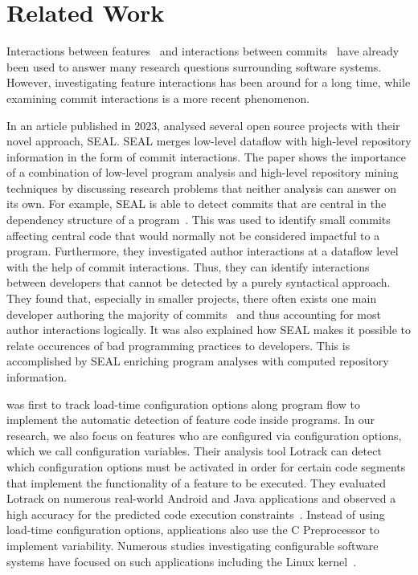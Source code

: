 \chapter{Related Work}\label{ch:related_work}

Interactions between features~\cite{siegmund2012predicting,nie2011survey,kolesnikov2017relation} and interactions between commits~\cite{sattler2023seal} have already been used to answer many research questions surrounding software systems.
However, investigating feature interactions has been around for a long time, while examining commit interactions is a more recent phenomenon. 

In an article published in 2023, \citet{sattler2023seal} analysed several open source projects with their novel approach, SEAL.
SEAL merges low-level dataflow with high-level repository information in the form of commit interactions.
The paper shows the importance of a combination of low-level program analysis and high-level repository mining techniques by discussing research problems that neither analysis can answer on its own.
For example, SEAL is able to detect commits that are central in the dependency structure of a program~\cite{sattler2023seal}.
This was used to identify small commits affecting central code that would normally not be considered impactful to a program.
Furthermore, they investigated author interactions at a dataflow level with the help of commit interactions.
Thus, they can identify interactions between developers that cannot be detected by a purely syntactical approach.
They found that, especially in smaller projects, there often exists one main developer authoring the majority of commits~\cite{sattler2023seal} and thus accounting for most author interactions logically. 
It was also explained how SEAL makes it possible to relate occurences of bad programming practices to developers. 
This is accomplished by SEAL enriching program analyses with computed repository information. 

\citet{lillack2014tracking} was first to track load-time configuration options along program flow to implement the automatic detection of feature code inside programs.
In our research, we also focus on features who are configured via configuration options, which we call configuration variables. 
Their analysis tool Lotrack can detect which configuration options must be activated in order for certain code segments that implement the functionality of a feature to be executed.
They evaluated Lotrack on numerous real-world Android and Java applications and observed a high accuracy for the predicted code execution constraints~\cite{lillack2014tracking}.
Instead of using load-time configuration options, applications also use the C Preprocessor to implement variability.
Numerous studies investigating configurable software systems have focused on such applications including the Linux kernel~\cite{passos2021scattering,michelon2021lifecycle,kolesnikov2017relation}.

